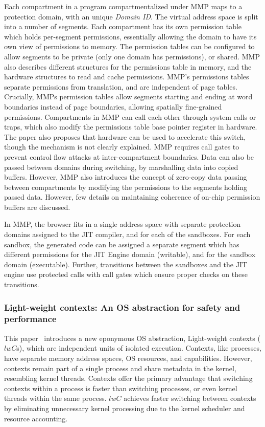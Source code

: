 Each compartment in a program compartmentalized under MMP maps to a protection
domain, with an unique \emph{Domain ID}.
The virtual address space is split into a number of segments.
Each compartment has its own permission table which holds per-segment permissions,
essentially allowing the domain to have its own view of permissions to memory.
The permission tables can be configured to allow segments to be private (only one 
domain has permissions), or shared.
MMP also describes different structures for the permissions table in memory, and
the hardware structures to read and cache permissions.
MMP's permissions tables separate permissions from translation, and are
independent of page tables.
Crucially, MMPs permission tables allow segments starting and ending at
word boundaries instead of page boundaries, allowing spatially fine-grained
permissions.
Compartments in MMP can call each other through system calls or traps, 
which also modify the permissions table base pointer register in hardware.
The paper also proposes that hardware can be used to accelerate this switch,
though the mechanism is not clearly explained.
MMP requires call gates to prevent control flow attacks at inter-compartment
boundaries.
Data can also be passed between domains during switching, by marshalling
data into copied buffers.
However, MMP also introduces the concept of zero-copy data passing between
compartments by modifying the permissions to the segments holding passed data.
However, few details on maintaining coherence of on-chip permission buffers 
are discussed.

In MMP, the browser fits in a single address space with separate protection 
domains assigned to the JIT compiler, and for each of the sandboxes.
For each sandbox, the generated code can be assigned a separate segment
which has different permissions for the JIT Engine domain (writable), 
and for the sandbox domain (executable).
Further, transitions between the sandboxes and the JIT engine use protected
calls with call gates which ensure proper checks on these transitions.

\subsubsection{Light-weight contexts: An OS abstraction for safety and performance}
This paper~\cite{LittonVE0BD16} introduces a new eponymous OS abstraction,
Light-weight contexts ($lwC$s),
which are independent units of isolated execution.
Contexts, like processes, have separate memory address spaces, OS resources,
and capabilities.
However, contexts remain part of a single process and share metadata in the 
kernel, resembling kernel threads.
Contexts offer the primary advantage that switching contexts within a process is 
faster than switching processes, or even kernel threads within the same process.
$lwC$ achieves faster switching between contexts by eliminating unnecessary kernel
processing due to the kernel scheduler and resource accounting.

